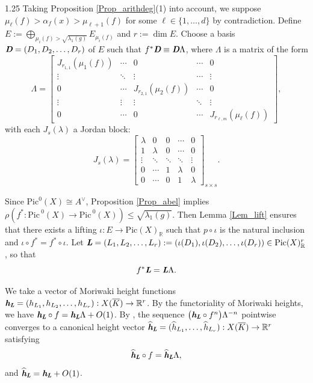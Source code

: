 \documentclass[12pt]{amsart}
\newcommand{\mb}[1]{\mathbb{#1}}
\newcommand{\mr}[1]{\mathrm{#1}}
\newcommand{\ov}{\overline}
\newcommand\ra{\rightarrow}
\newcommand\Pic{\mathrm{Pic\,}}
\newcommand{\mib}[1]{\textit{\textbf{#1}}}
\begin{document}
\begin{spacing}{1.25}
Taking Proposition \ref{Prop_arithdeg}(1) into account, we suppose $\mu_{\ell}(f)>\alpha_f(x)>\mu_{\ell+1}(f)$ for some $\ell\in\{1,\dots,d\}$ by contradiction. Define $E:=\bigoplus\limits_{\mu_i(f)>\sqrt{\lambda_1(g)}}E_{\mu_i(f)}$ and $r:=\dim E$. Choose a basis $\mib{D}=(D_1,D_2,\ldots,D_r)$ of $E$ such that $f^*\mib{D}\equiv \mib{D} \Lambda$, where $\Lambda$ is a matrix of the form
\[
\Lambda = 
\begin{bmatrix}
J_{r_{1,1}}(\mu_1(f)) &   \cdots     & 0               & \cdots          & 0 \\
\vdots         &\ddots       & \vdots              & \cdots          & \vdots\\
0              & \cdots        & J_{r_{2,1}}(\mu_2(f)) & \cdots          & 0 \\
\vdots         &\vdots         & \vdots            & \ddots          & \vdots \\
0              & \cdots       & 0                 & \cdots          & J_{r_{\ell,m}}(\mu_{\ell}(f))
\end{bmatrix},
\]
with each $J_s(\lambda)$ a Jordan block:
\[J_{s}(\lambda) = 
\begin{bmatrix}
\lambda & 0 & 0 & \cdots & 0 \\
1 & \lambda & 0 & \cdots & 0 \\
\vdots & \ddots & \ddots & \ddots & \vdots \\
0 & \cdots & 1 & \lambda & 0 \\
0 & \cdots & 0 & 1 & \lambda
\end{bmatrix}_{s\times s}.\]

Since $\mr{Pic}^0(X)\cong A^{\vee}$, Proposition \ref{Prop_abel} implies $\rho(f^*:\Pic^0(X)\rightarrow\Pic^0(X))\leq \sqrt{\lambda_1(g)}$. Then Lemma \ref{Lem_lift} ensures that there exists a lifting $\iota: E\ra \mr{Pic}(X)_{\mb{R}}$ such that $p\circ \iota$ is the natural inclusion and $\iota\circ f^*=f^*\circ \iota$. Let $\mib{L}=(L_1,L_2,\ldots,L_r):=(\iota(D_1),\iota(D_2),\ldots,\iota(D_r))\in \mr{Pic}(X)_{\mb{R}}^{r}$, so that
\[f^*\mib{L}=\mib{L}\Lambda.\]

We take a vector of Moriwaki height functions $\mib{h}_{\mib{L}}=(h_{L_1},h_{L_2},\ldots, h_{L_r}): X(\ov{K})\ra\mb{R}^{r}$. By the functoriality of Moriwaki heights, we have $\mib{h}_{\mib{L}}\circ f=\mib{h}_{\mib{L}}\Lambda+O(1)$. By \cite[Theorem 5]{KS16}, the sequence $\big(\mib{h}_{\mib{L}}\circ f^n\big)\Lambda^{-n}$ pointwise converges to a canonical height vector $\widehat{\mib{h}}_{\mib{L}}=(\widehat{h}_{L_1},\ldots,\widehat{h}_{L_r}):X(\ov{K})\ra \mb{R}^{r}$ satisfying
\[\widehat{\mib{h}}_{\mib{L}}\circ f=\widehat{\mib{h}}_{\mib{L}}\Lambda,\]
and $\widehat{\mib{h}}_{\mib{L}}=\mib{h}_{\mib{L}}+O(1)$.


\end{spacing}
\end{document}
